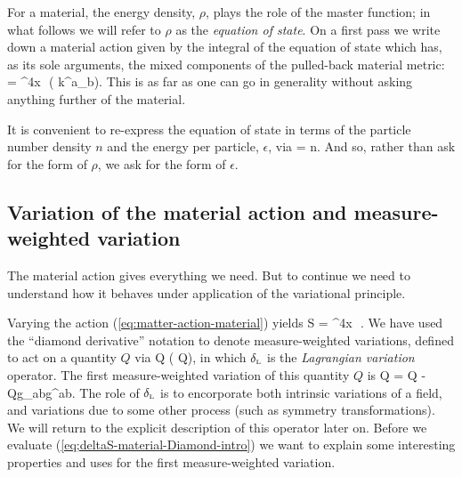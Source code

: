 For a material, the energy density, $\rho$,    plays the role of the master function; in what follows we will refer to $\rho$ as the \textit{equation of state}. On a first pass  we write down a material action given by the integral of the equation of state which has, as its sole arguments, the mixed components of the pulled-back material metric:
\bea
\label{material-action-k-no-invaraints-1}
 =  \int \dd^4x\,\, \rho\left( {k^a}_b\right).
\eea 
This is as far as one can go in generality without asking anything further of the material. 

It is convenient to re-express the equation of state in terms of the particle number density $n$ and the energy per particle, $\epsilon$, via
\bea
\label{eq:decomp_n_rho_ep}
\rho = n\epsilon.
\eea
And so, rather than ask for the form of $\rho$, we ask for the form of $\epsilon$.

\subsection{Variation of the material action and measure-weighted variation}
\label{sec:var-mat-action-mes-we-var}
The material action gives everything we need. But to continue we need to understand how it behaves under application of the variational principle.

Varying the action (\ref{eq:matter-action-material}) yields
\bea
\label{eq;deltaS-material-Diamond-intro}
\delta S = \int \dd^4x\,\, \Diamond\rho.
\eea
We have used the ``diamond derivative'' notation to denote measure-weighted variations, defined to act on a quantity $Q$ via
\bea
\Diamond Q  {} \lp\left( Q\right),
\eea
in which ${ {\delta}_{\scriptscriptstyle{\rm{L}}}}$ is the \textit{Lagrangian variation} operator. The first measure-weighted variation of this quantity $Q$ is
\bea
\label{eq:sec:diamond-Q-first}
\Diamond Q = \lp Q - Qg_{ab}\lp g^{ab}.
\eea
The role of ${ {\delta}_{\scriptscriptstyle{\rm{L}}}}$ is to encorporate both intrinsic variations of a field, and variations due to some other process (such as symmetry transformations). We will return to the explicit description of this operator later on.
Before we  evaluate (\ref{eq;deltaS-material-Diamond-intro}) we want to explain some interesting properties and uses for the first measure-weighted variation.

